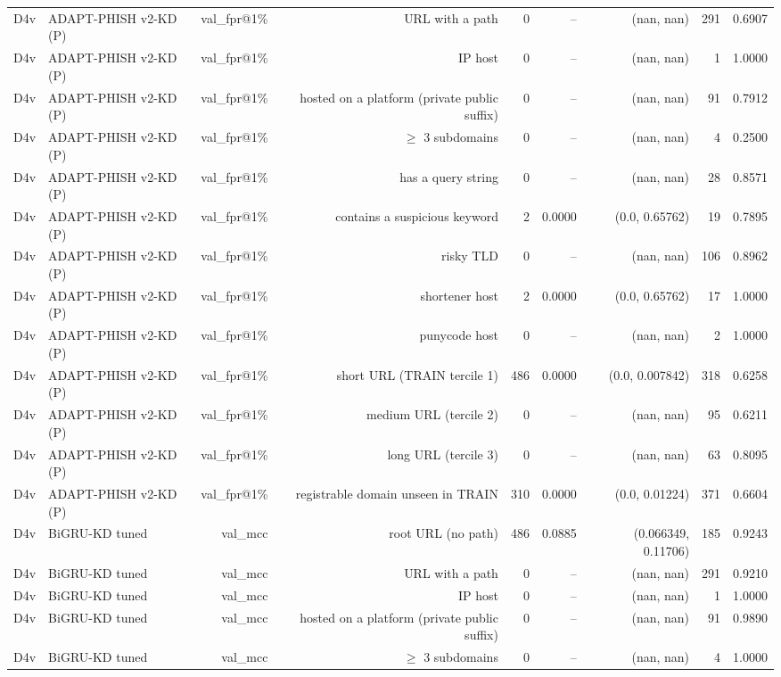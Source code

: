 \begin{table}[t]
\begin{tabular}{llrrrrrrr}
D4v & ADAPT-PHISH v2-KD (P) & val\_fpr@1\% & URL with a path & 0 & -- & (nan, nan) & 291 & 0.6907 \\
D4v & ADAPT-PHISH v2-KD (P) & val\_fpr@1\% & IP host & 0 & -- & (nan, nan) & 1 & 1.0000 \\
D4v & ADAPT-PHISH v2-KD (P) & val\_fpr@1\% & hosted on a platform (private public suffix) & 0 & -- & (nan, nan) & 91 & 0.7912 \\
D4v & ADAPT-PHISH v2-KD (P) & val\_fpr@1\% & $\geq$ 3 subdomains & 0 & -- & (nan, nan) & 4 & 0.2500 \\
D4v & ADAPT-PHISH v2-KD (P) & val\_fpr@1\% & has a query string & 0 & -- & (nan, nan) & 28 & 0.8571 \\
D4v & ADAPT-PHISH v2-KD (P) & val\_fpr@1\% & contains a suspicious keyword & 2 & 0.0000 & (0.0, 0.65762) & 19 & 0.7895 \\
D4v & ADAPT-PHISH v2-KD (P) & val\_fpr@1\% & risky TLD & 0 & -- & (nan, nan) & 106 & 0.8962 \\
D4v & ADAPT-PHISH v2-KD (P) & val\_fpr@1\% & shortener host & 2 & 0.0000 & (0.0, 0.65762) & 17 & 1.0000 \\
D4v & ADAPT-PHISH v2-KD (P) & val\_fpr@1\% & punycode host & 0 & -- & (nan, nan) & 2 & 1.0000 \\
D4v & ADAPT-PHISH v2-KD (P) & val\_fpr@1\% & short URL (TRAIN tercile 1) & 486 & 0.0000 & (0.0, 0.007842) & 318 & 0.6258 \\
D4v & ADAPT-PHISH v2-KD (P) & val\_fpr@1\% & medium URL (tercile 2) & 0 & -- & (nan, nan) & 95 & 0.6211 \\
D4v & ADAPT-PHISH v2-KD (P) & val\_fpr@1\% & long URL (tercile 3) & 0 & -- & (nan, nan) & 63 & 0.8095 \\
D4v & ADAPT-PHISH v2-KD (P) & val\_fpr@1\% & registrable domain unseen in TRAIN & 310 & 0.0000 & (0.0, 0.01224) & 371 & 0.6604 \\
D4v & BiGRU-KD tuned & val\_mcc & root URL (no path) & 486 & 0.0885 & (0.066349, 0.11706) & 185 & 0.9243 \\
D4v & BiGRU-KD tuned & val\_mcc & URL with a path & 0 & -- & (nan, nan) & 291 & 0.9210 \\
D4v & BiGRU-KD tuned & val\_mcc & IP host & 0 & -- & (nan, nan) & 1 & 1.0000 \\
D4v & BiGRU-KD tuned & val\_mcc & hosted on a platform (private public suffix) & 0 & -- & (nan, nan) & 91 & 0.9890 \\
D4v & BiGRU-KD tuned & val\_mcc & $\geq$ 3 subdomains & 0 & -- & (nan, nan) & 4 & 1.0000 \\

\end{tabular}
\end{table}
